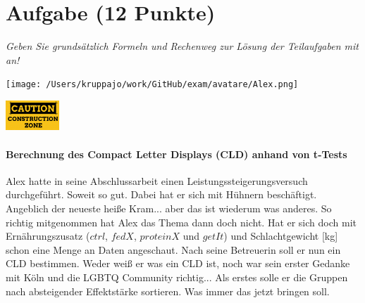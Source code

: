 \documentclass[a4paper, 9pt]{scrartcl}\usepackage[]{graphicx}\usepackage[]{xcolor}
\begin{document}
 
\clearpage

\section{Aufgabe \hfill (12 Punkte)}

\textit{Geben Sie grundsätzlich Formeln und Rechenweg zur Lösung der Teilaufgaben mit an!} \\[1Ex]
 

 
\begin{minipage}[t]{0.5\textwidth}
\texttt{[image: /Users/kruppajo/work/GitHub/exam/avatare/Alex.png]}
\end{minipage}
\begin{minipage}[t]{0.5\textwidth}
\hfill
\href{https://youtu.be/RagTFFKFbFg}{\includegraphics[width = 2cm]{img/caution}}
\end{minipage}
\vspace{-3ex}



\paragraph{Berechnung des Compact Letter Displays (CLD) anhand von t-Tests}

Alex hatte in seine Abschlussarbeit einen Leistungssteigerungsversuch durchgeführt. Soweit so gut. Dabei hat er sich mit Hühnern beschäftigt. Angeblich der neueste heiße Kram... aber das ist wiederum was anderes. So richtig mitgenommen hat Alex das Thema dann doch nicht. Hat er sich doch mit Ernährungszusatz ($ctrl$, $fedX$, $proteinX$ und $getIt$) und Schlachtgewicht [kg] schon eine Menge an Daten angeschaut. Nach seine Betreuerin soll er nun ein CLD bestimmen. Weder weiß er was ein CLD ist, noch war sein erster Gedanke mit Köln und die LGBTQ Community richtig... Als erstes solle er die Gruppen nach absteigender Effektstärke sortieren. Was immer das jetzt bringen soll.
\end{document}
